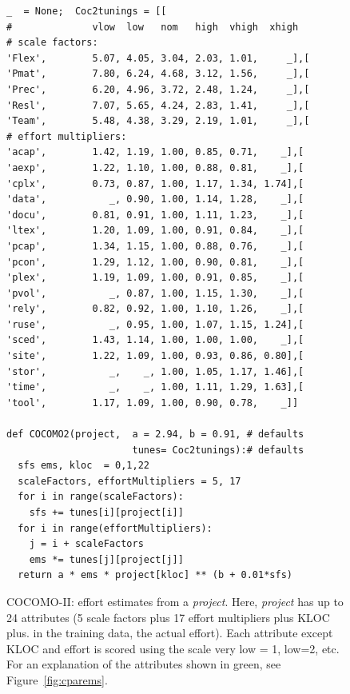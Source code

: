 \documentclass{sig-alternate}
\newcommand{\fig}[1]{Figure~\ref{fig:#1}}
\begin{document}
\begin{figure}[!t]
\begin{lstlisting}
_  = None;  Coc2tunings = [[
#              vlow  low   nom   high  vhigh  xhigh   
# scale factors:
'Flex',        5.07, 4.05, 3.04, 2.03, 1.01,     _],[
'Pmat',        7.80, 6.24, 4.68, 3.12, 1.56,     _],[
'Prec',        6.20, 4.96, 3.72, 2.48, 1.24,     _],[
'Resl',        7.07, 5.65, 4.24, 2.83, 1.41,     _],[
'Team',        5.48, 4.38, 3.29, 2.19, 1.01,     _],[
# effort multipliers:        
'acap',        1.42, 1.19, 1.00, 0.85, 0.71,    _],[
'aexp',        1.22, 1.10, 1.00, 0.88, 0.81,    _],[
'cplx',        0.73, 0.87, 1.00, 1.17, 1.34, 1.74],[
'data',           _, 0.90, 1.00, 1.14, 1.28,    _],[
'docu',        0.81, 0.91, 1.00, 1.11, 1.23,    _],[
'ltex',        1.20, 1.09, 1.00, 0.91, 0.84,    _],[
'pcap',        1.34, 1.15, 1.00, 0.88, 0.76,    _],[ 
'pcon',        1.29, 1.12, 1.00, 0.90, 0.81,    _],[
'plex',        1.19, 1.09, 1.00, 0.91, 0.85,    _],[ 
'pvol',           _, 0.87, 1.00, 1.15, 1.30,    _],[
'rely',        0.82, 0.92, 1.00, 1.10, 1.26,    _],[
'ruse',           _, 0.95, 1.00, 1.07, 1.15, 1.24],[
'sced',        1.43, 1.14, 1.00, 1.00, 1.00,    _],[ 
'site',        1.22, 1.09, 1.00, 0.93, 0.86, 0.80],[ 
'stor',           _,    _, 1.00, 1.05, 1.17, 1.46],[
'time',           _,    _, 1.00, 1.11, 1.29, 1.63],[
'tool',        1.17, 1.09, 1.00, 0.90, 0.78,    _]]

def COCOMO2(project,  a = 2.94, b = 0.91, # defaults
                      tunes= Coc2tunings):# defaults 
  sfs ems, kloc  = 0,1,22          
  scaleFactors, effortMultipliers = 5, 17
  for i in range(scaleFactors):
    sfs += tunes[i][project[i]]
  for i in range(effortMultipliers):
    j = i + scaleFactors
    ems *= tunes[j][project[j]] 
  return a * ems * project[kloc] ** (b + 0.01*sfs) 
\end{lstlisting}
\caption{COCOMO-II: effort estimates from a {\em project}.
Here, {\em project} has up to 24 attributes  (5 scale
factors plus 17 effort multipliers plus KLOC plus. in the training data, the actual effort).
Each attribute except KLOC and effort is scored
using the scale very low = 1, low=2, etc.
For an explanation of the attributes shown in
green, see \fig{cparems}.}\label{fig:coc2}
\end{figure}

\end{document}
